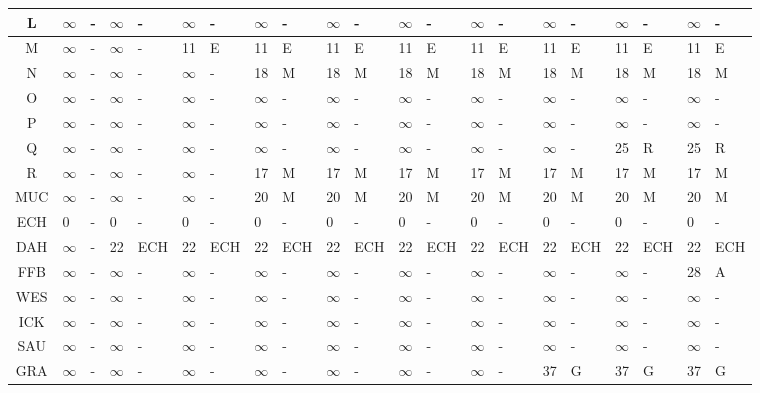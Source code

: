 \begin{table}[H]
\begin{tabular}{|c|*{10}{|p{0.2cm}|p{0.5cm}|}}
L & $\infty$ & - & $\infty$ & - & $\infty$ & - & $\infty$ & - & $\infty$ & - & $\infty$ & - & $\infty$ & - & $\infty$ & - & $\infty$ & - & $\infty$ & -\\\hline
M & $\infty$ & - & $\infty$ & - & 11 & E & 11 & E & 11 & E & 11 & E & 11 & E & 11 & E & 11 & E & 11 & E\\\hline
N & $\infty$ & - & $\infty$ & - & $\infty$ & - & 18 & M & 18 & M & 18 & M & 18 & M & 18 & M & 18 & M & 18 & M\\\hline
O & $\infty$ & - & $\infty$ & - & $\infty$ & - & $\infty$ & - & $\infty$ & - & $\infty$ & - & $\infty$ & - & $\infty$ & - & $\infty$ & - & $\infty$ & -\\\hline
P & $\infty$ & - & $\infty$ & - & $\infty$ & - & $\infty$ & - & $\infty$ & - & $\infty$ & - & $\infty$ & - & $\infty$ & - & $\infty$ & - & $\infty$ & -\\\hline
Q & $\infty$ & - & $\infty$ & - & $\infty$ & - & $\infty$ & - & $\infty$ & - & $\infty$ & - & $\infty$ & - & $\infty$ & - & 25 & R & 25 & R\\\hline
R & $\infty$ & - & $\infty$ & - & $\infty$ & - & 17 & M & 17 & M & 17 & M & 17 & M & 17 & M & 17 & M & 17 & M\\\hline
MUC & $\infty$ & - & $\infty$ & - & $\infty$ & - & 20 & M & 20 & M & 20 & M & 20 & M & 20 & M & 20 & M & 20 & M\\\hline
ECH & 0 & - & 0 & - & 0 & - & 0 & - & 0 & - & 0 & - & 0 & - & 0 & - & 0 & - & 0 & -\\\hline
DAH & $\infty$ & - & 22 & ECH & 22 & ECH & 22 & ECH & 22 & ECH & 22 & ECH & 22 & ECH & 22 & ECH & 22 & ECH & 22 & ECH\\\hline
FFB & $\infty$ & - & $\infty$ & - & $\infty$ & - & $\infty$ & - & $\infty$ & - & $\infty$ & - & $\infty$ & - & $\infty$ & - & $\infty$ & - & 28 & A\\\hline
WES & $\infty$ & - & $\infty$ & - & $\infty$ & - & $\infty$ & - & $\infty$ & - & $\infty$ & - & $\infty$ & - & $\infty$ & - & $\infty$ & - & $\infty$ & -\\\hline
ICK & $\infty$ & - & $\infty$ & - & $\infty$ & - & $\infty$ & - & $\infty$ & - & $\infty$ & - & $\infty$ & - & $\infty$ & - & $\infty$ & - & $\infty$ & -\\\hline
SAU & $\infty$ & - & $\infty$ & - & $\infty$ & - & $\infty$ & - & $\infty$ & - & $\infty$ & - & $\infty$ & - & $\infty$ & - & $\infty$ & - & $\infty$ & -\\\hline
GRA & $\infty$ & - & $\infty$ & - & $\infty$ & - & $\infty$ & - & $\infty$ & - & $\infty$ & - & $\infty$ & - & 37 & G & 37 & G & 37 & G\\\hline

\end{tabular}
\end{table}
